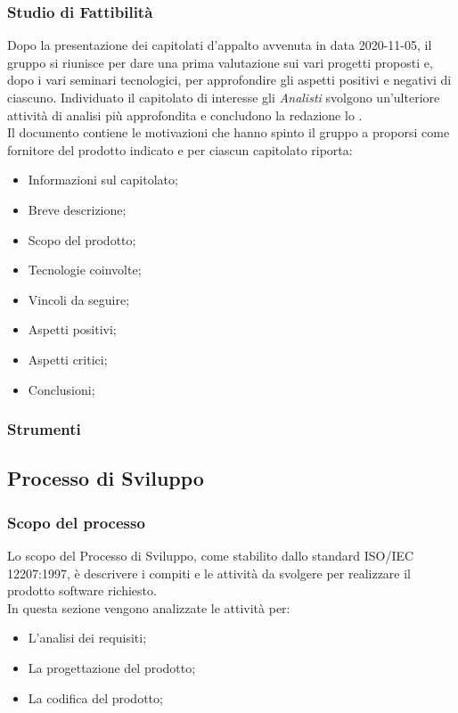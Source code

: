 \subsubsection{Studio di Fattibilità}\label{SdF}
Dopo la presentazione dei capitolati d'appalto avvenuta in data 2020-11-05, il gruppo si riunisce per dare una prima valutazione sui vari progetti proposti e, dopo i vari seminari tecnologici, per approfondire gli aspetti positivi e negativi di ciascuno. Individuato il capitolato di interesse gli \textit{Analisti} svolgono un'ulteriore attività di analisi più approfondita e concludono la redazione lo \SdFv. \\
Il documento contiene le motivazioni che hanno spinto il gruppo a proporsi come fornitore del prodotto indicato e per ciascun capitolato riporta:
\begin{itemize}
\item Informazioni sul capitolato;
\item Breve descrizione;
\item Scopo del prodotto;
\item Tecnologie coinvolte;
\item Vincoli da seguire;
\item Aspetti positivi;
\item Aspetti critici;
\item Conclusioni;
\end{itemize}

\subsubsection{Strumenti}

\newpage

\subsection{Processo di Sviluppo}
\subsubsection{Scopo del processo}\label{PS_Scopo}
Lo scopo del Processo di Sviluppo, come stabilito dallo standard ISO/IEC 12207:1997, è descrivere i compiti e le attività da svolgere per realizzare il prodotto software richiesto. \\
In questa sezione vengono analizzate le attività per:
\begin{itemize}
	\item L'analisi dei requisiti;
	\item La progettazione del prodotto;
	\item La codifica del prodotto;
\end{itemize}

